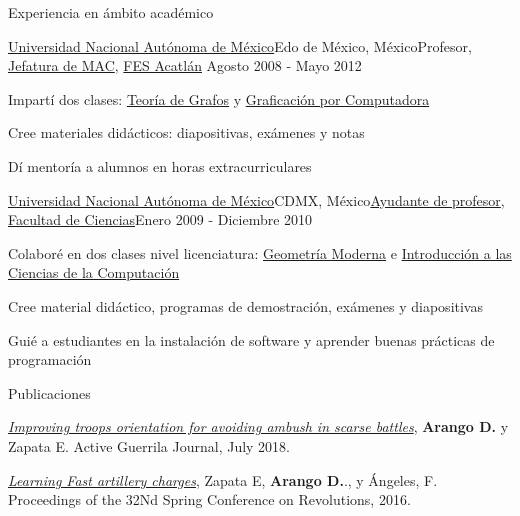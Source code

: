 \documentclass{resume} %
\begin{document}
\begin{rSection}{Experiencia en ámbito académico}
	\begin{rSubsection}{\href{http://www.unam.mx}{Universidad Nacional Autónoma de México}}{Edo de México, México}{Profesor, \href{http://www.mac.acatlan.unam.mx}{Jefatura de MAC}, \href{https://www.acatlan.unam.mx}{FES Acatlán}} {Agosto 2008 - Mayo 2012}
	\item Impartí dos clases: \href{https://www.acatlan.unam.mx/files/PlanesDeEstudio/MAC/4/Teoria_de_Graficas.pdf}{Teoría de Grafos} y \href{https://www.acatlan.unam.mx/files/PlanesDeEstudio/MAC/7/Graficacion_por_Computadora.pdf}{Graficación por Computadora}
	\item Cree materiales didácticos: diapositivas, exámenes y notas
	\item Dí mentoría a alumnos en horas extracurriculares
	\end{rSubsection}
	
	\begin{rSubsection}{\href{http://www.unam.mx}{Universidad Nacional Autónoma de México}}{CDMX, México}{\href{http://www.fciencias.unam.mx/directorio/63922}{Ayudante de profesor}, \href{http://www.fciencias.unam.mx/}{Facultad de Ciencias}}{Enero 2009 - Diciembre 2010}
	\item Colaboré en dos clases nivel licenciatura: \href{http://www.fciencias.unam.mx/licenciatura/asignaturas/217/249}{Geometría Moderna} e \href{http://www.fciencias.unam.mx/licenciatura/asignaturas/2017/1236}{Introducción a las Ciencias de la Computación}
	\item Cree material didáctico, programas de demostración, exámenes y diapositivas
	\item Guié a estudiantes en la instalación de software y aprender buenas prácticas de programación
	\end{rSubsection}

\end{rSection}

\begin{rSection}{Publicaciones} \itemsep 1pt
\item \textit{\href{http://www.sciencedirect.com/science/article/pii}{Improving troops orientation for avoiding ambush in scarse battles}}, { \bf Arango D.} y Zapata E. Active Guerrila Journal, July 2018.
\item \textit{\href{http://dl.acm.org/doi/abs/10.1145/}{Learning Fast artillery charges}}, Zapata E, { \bf Arango D.}., y Ángeles, F. Proceedings of the 32Nd Spring Conference on Revolutions, 2016.
\end{rSection}
\end{document}
